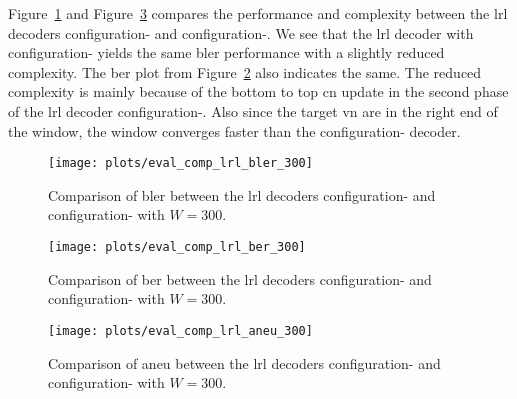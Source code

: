 Figure~\ref{fig:eval_comp_lrl_bler_300} and Figure~\ref{fig:eval_comp_lrl_aneu_300} compares the performance and complexity between the \ac{lrl} decoders configuration- and configuration-. We see that the \ac{lrl} decoder with configuration- yields the same \ac{bler} performance with a slightly reduced complexity. The \ac{ber} plot from Figure~\ref{fig:eval_comp_lrl_ber_300} also indicates the same. The reduced complexity is mainly because of the bottom to top \ac{cn} update in the second phase of the \ac{lrl} decoder configuration-. Also since the target \ac{vn} are in the right end of the window, the window converges faster than the configuration- decoder.
\begin{figure}[htbp]
  \centering
  \texttt{[image: plots/eval\_comp\_lrl\_bler\_300]}
  \caption{Comparison of \ac{bler} between the \ac{lrl} decoders configuration- and configuration- with $W=300$.}
  \label{fig:eval_comp_lrl_bler_300}
\end{figure}
\begin{figure}[htbp]
  \centering
  \texttt{[image: plots/eval\_comp\_lrl\_ber\_300]}
  \caption{Comparison of \ac{ber} between the \ac{lrl} decoders configuration- and configuration- with $W=300$.}
  \label{fig:eval_comp_lrl_ber_300}
\end{figure}
\begin{figure}[htbp]
  \centering
  \texttt{[image: plots/eval\_comp\_lrl\_aneu\_300]}
  \caption{Comparison of \ac{aneu} between the \ac{lrl} decoders configuration- and configuration- with $W=300$.}
  \label{fig:eval_comp_lrl_aneu_300}
\end{figure}

